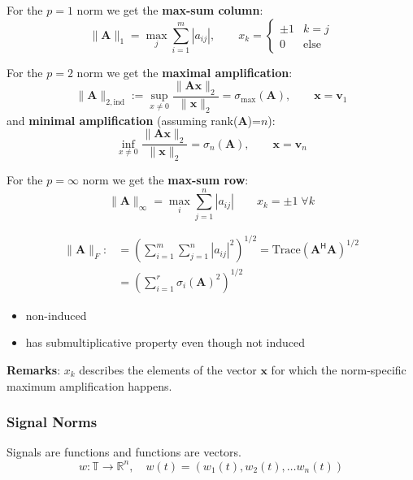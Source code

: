 
For the $p = 1$ norm we get the \textbf{max-sum column}:
\begin{equation*}
    \|\mathbf{A}\|_1=\max_j\sum_{i=1}^m|a_{ij}|,\qquad x_k=\begin{cases}
        \pm 1 & k=j         \\
        0     & \text{else}
    \end{cases}
\end{equation*}

\newpar{}
For the $p = 2$ norm we get the \textbf{maximal amplification}:
\noindent\begin{equation*}
    \|\mathbf{A}\|_{2,\mathrm{ind}}:=\sup_{x\neq0}\frac{\|\mathbf{Ax}\|_2}{\|\mathbf{x}\|_2}=\sigma_{\max}(\mathbf{A}),\qquad \mathbf{x}=\mathbf{v}_1
\end{equation*}
and \textbf{minimal amplification} (assuming rank($\mathbf{A}$)=$n$):
\noindent\begin{equation*}
    \inf_{x\neq0}\frac{\|\mathbf{Ax}\|_2}{\|\mathbf{x}\|_2}=\sigma_n(\mathbf{A}),\qquad \mathbf{x}=\mathbf{v}_n
\end{equation*}

\newpar{}
For the $p = \infty$ norm we get the \textbf{max-sum row}:
\begin{equation*}
    \|\mathbf{A}\|_\infty=\max_i\sum_{j=1}^n|a_{ij}|\qquad x_k=\pm 1\;\forall k
\end{equation*}


\noindent\begin{align*}
    \|\mathbf{A}\|_F: & ={\left(\sum_{i=1}^m\sum_{j=1}^n|a_{ij}|^2\right)}^{1/2}=\text{Trace}{(\mathbf{A}^{\mathsf{H}}\mathbf{A})}^{1/2} \\
                      & = {\left(\sum_{i=1}^r\sigma_i{(\mathbf{A})}^2\right)}^{1/2}
\end{align*}

\begin{itemize}
    \item non-induced
    \item has submultiplicative property even though not induced
\end{itemize}

\textbf{Remarks}: $x_k$ describes the elements of the vector $\mathbf{x}$ for which the norm-specific maximum amplification happens.

\subsubsection{Signal Norms}
Signals are functions and functions are vectors.
\noindent\begin{equation*}
    w:\mathbb{T}\rightarrow \mathbb{R}^n, \quad w(t)=(w_1(t), w_2(t), \ldots w_n(t))
\end{equation*}

